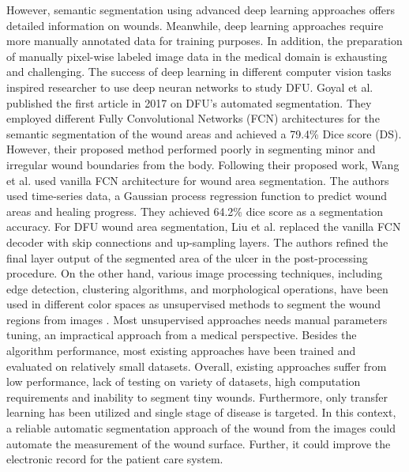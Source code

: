 \documentclass[review]{elsarticle}
\begin{document}
\indent However, semantic segmentation using advanced deep learning approaches offers detailed information on wounds. Meanwhile, deep learning approaches require more manually annotated data for training purposes. In addition, the preparation of manually pixel-wise labeled image data in the medical domain is exhausting and challenging. The success of deep learning in different computer vision tasks inspired researcher to use deep neuran networks to study DFU. Goyal et al. \cite{goyal2017fully} published the first article in 2017 on DFU's automated segmentation. They employed different Fully Convolutional Networks (FCN) architectures for the semantic segmentation of the wound areas and achieved a 79.4\% Dice score (DS). However, their proposed method performed poorly in segmenting minor and irregular wound boundaries from the body. Following their proposed work, Wang et al. \cite{wang2015unified} used vanilla FCN architecture for wound area segmentation. The authors used time-series data, a Gaussian process regression function to predict wound areas and healing progress. They achieved 64.2\% dice score as a segmentation accuracy. For DFU wound area segmentation, Liu et al. \cite{liu2015automatic} replaced the vanilla FCN decoder with skip connections and up-sampling layers. The authors refined the final layer output of the segmented area of the ulcer in the post-processing procedure. 
\newline\indent On the other hand, various image processing techniques, including edge detection, clustering algorithms, and morphological operations, have been used in different color spaces as unsupervised methods to segment the wound regions from images \cite{yadav2013segmentation,castro2006analysis,chung2000segmenting}. Most unsupervised approaches needs manual parameters tuning, an impractical approach from a medical perspective. Besides the algorithm performance, most existing approaches have been trained and evaluated on relatively small datasets. Overall, existing approaches suffer from low performance, lack of testing on variety of datasets, high computation requirements and inability to segment tiny wounds. Furthermore, only transfer learning has been utilized and single stage of disease is targeted. In this context, a reliable automatic segmentation approach of the wound from the images could automate the measurement of the wound surface. Further, it could improve the electronic record for the patient care system.
\end{document}
